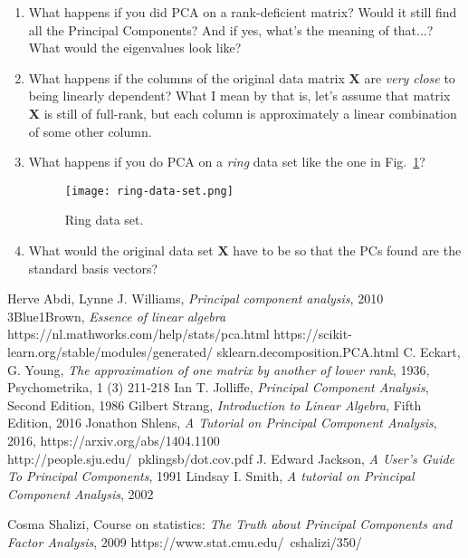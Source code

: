 \documentclass[10pt,twocolumn]{article}
\begin{document}
\begin{enumerate}
\item What happens if you did PCA on a rank-deficient matrix? Would it still find all the Principal Components? And if yes, what's the meaning of that...? What would the eigenvalues look like?
\item What happens if the columns of the original data matrix $\mathbf{X}$ are \textit{very close} to being linearly dependent? What I mean by that is, let's assume that matrix $\mathbf{X}$ is still of full-rank, but each column is approximately a linear combination of some other column.
\item What happens if you do PCA on a \textit{ring} data set like the one in Fig.~\ref{fig:ring-data-set}?
\begin{figure}[H]
\centering\texttt{[image: ring-data-set.png]}
\caption{Ring data set.}
\label{fig:ring-data-set}
\end{figure}
\item What would the original data set $\mathbf{X}$ have to be so that the PCs found are the standard basis vectors?
\end{enumerate}






\thebibliography{}

 Herve Abdi, Lynne J. Williams, \textit{Principal component analysis}, 2010
 3Blue1Brown, \textit{Essence of linear algebra}
 https://nl.mathworks.com/help/stats/pca.html
 https://scikit-learn.org/stable/modules/generated/
sklearn.decomposition.PCA.html
 C. Eckart, G. Young, \textit{The approximation of one matrix by another of lower rank}, 1936, Psychometrika, 1 (3) 211-218
 Ian T. Jolliffe, \textit{Principal Component Analysis}, Second Edition, 1986
 Gilbert Strang, \textit{Introduction to Linear Algebra}, Fifth Edition, 2016
 Jonathon Shlens, \textit{A Tutorial on Principal Component Analysis}, 2016, https://arxiv.org/abs/1404.1100
 http://people.sju.edu/~pklingsb/dot.cov.pdf
 J. Edward Jackson, \textit{A User's Guide To Principal Components}, 1991
 Lindsay I. Smith, \textit{A tutorial on Principal Component Analysis}, 2002

 Cosma Shalizi, Course on statistics: \textit{The Truth about Principal Components and Factor Analysis}, 2009 https://www.stat.cmu.edu/~cshalizi/350/
\end{document}
